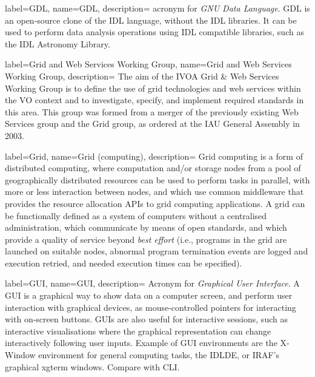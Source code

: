 {
    label={GDL},
    name={GDL},
    description={
    	acronym for \emph{GNU Data Language}. GDL is an
        \gls{open-source} clone of the \gls{IDL} language, without the
        IDL libraries. It can be used to perform data analysis
        operations using IDL compatible libraries, such as the \gls{IDL
        Astronomy Library}.
    }
}

{
    label={Grid and Web Services Working Group},
    name={Grid and Web Services Working Group},
    description={
    	The aim of the \gls{IVOA} Grid & Web Services Working Group is
        to define the use of \gls{grid} technologies and \gls{web
        services} within the VO context and to investigate, specify,
        and implement required standards in this area. This group was
        formed from a merger of the previously existing Web Services
        group and the Grid group, as ordered at the IAU General
        Assembly in 2003.
    }
}

{
	label={Grid},
	name={Grid (computing)},
	description={
		Grid computing is a form of distributed computing, where
        computation and/or storage nodes from a pool of geographically
        distributed resources can be used to perform tasks in parallel,
        with more or less interaction between nodes, and which use
        common \gls{middleware} that provides the resource allocation
        \gls{API}s to grid computing applications. A grid can be
        functionally defined as a system of computers without a
        centralised administration, which communicate by means of open
        standards, and which provide a quality of service beyond
        \emph{best effort} (i.e., programs in the grid are launched on
        suitable nodes, abnormal program termination events are logged
        and execution retried, and needed execution times can be
        specified).
	}
}

{
    label={GUI},
    name={GUI},
    description={
    	Acronym for \emph{Graphical User Interface}. A GUI is a
        graphical way to show data on a computer screen, and perform
        user interaction with graphical devices, as mouse-controlled
        pointers for interacting with on-screen buttons. GUIs are also
        useful for \gls{interactive sessions}, such as interactive
        visualisations where the graphical representation can change
        interactively following user inputs. Example of GUI
        environments are the X-Window environment for general computing
        tasks, the IDLDE, or IRAF's graphical xgterm windows. Compare
        with \gls{CLI}.
    }
}

